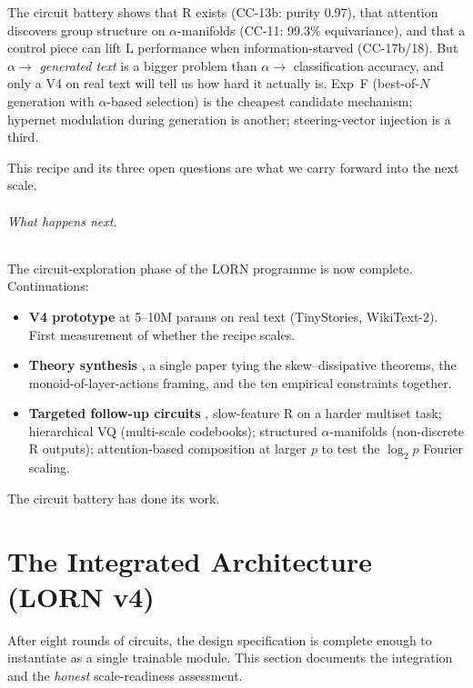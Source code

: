 \documentclass[10pt, twocolumn, a4paper]{article}
\begin{document}
The circuit battery shows that R exists (CC-13b: purity 0.97), that attention discovers group structure on $\alpha$-manifolds (CC-11: 99.3\% equivariance), and that a control piece can lift L performance when information-starved (CC-17b/18). But $\alpha \to$ \emph{generated text} is a bigger problem than $\alpha \to$ classification accuracy, and only a V4 on real text will tell us how hard it actually is. Exp~F (best-of-$N$ generation with $\alpha$-based selection) is the cheapest candidate mechanism; hypernet modulation during generation is another; steering-vector injection is a third.

This recipe and its three open questions are what we carry forward into the next scale.

\paragraph{What happens next.}

The circuit-exploration phase of the LORN programme is now complete. Continuations:

\begin{itemize}[nosep,leftmargin=*]
\item \textbf{V4 prototype} at 5--10M params on real text (TinyStories, WikiText-2). First measurement of whether the recipe scales.
\item \textbf{Theory synthesis} ,  a single paper tying the skew--dissipative theorems, the monoid-of-layer-actions framing, and the ten empirical constraints together.
\item \textbf{Targeted follow-up circuits} ,  slow-feature R on a harder multiset task; hierarchical VQ (multi-scale codebooks); structured $\alpha$-manifolds (non-discrete R outputs); attention-based composition at larger $p$ to test the $\log_2 p$ Fourier scaling.
\end{itemize}

The circuit battery has done its work.


\part*{The Integrated Architecture (LORN v4)}

After eight rounds of circuits, the design specification is complete enough to instantiate as a single trainable module. This section documents the integration and the \emph{honest} scale-readiness assessment.
\end{document}
